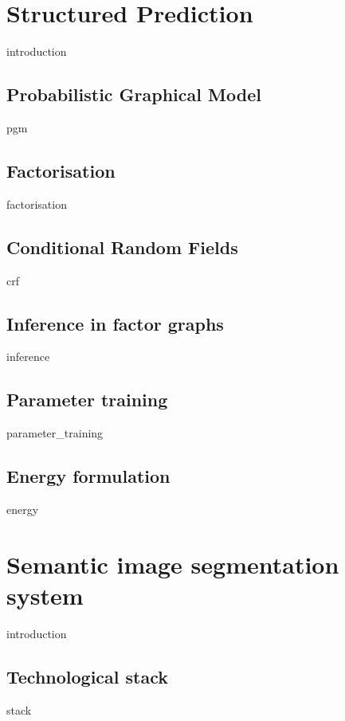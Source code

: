 \documentclass[12pt]{report}
\begin{document}
\chapter{Structured Prediction}
    \label{chapter:structured_prediction}
    {introduction}
    
    \section{Probabilistic Graphical Model}
    {pgm}
    
    \section{Factorisation}
    {factorisation}
    
    \section{Conditional Random Fields }
    {crf}
    	
    \section{Inference in factor graphs}
    \label{sec:inference}
    {inference}
    
    \section{Parameter training }
    {parameter_training}
    
    \section{Energy formulation}	
    \label{sec:energy}
    {energy}
    

\chapter{Semantic image segmentation system}
    \label{chapter:system}
    {introduction}
    
    \section{Technological stack}	
    {stack}
    
\end{document}
